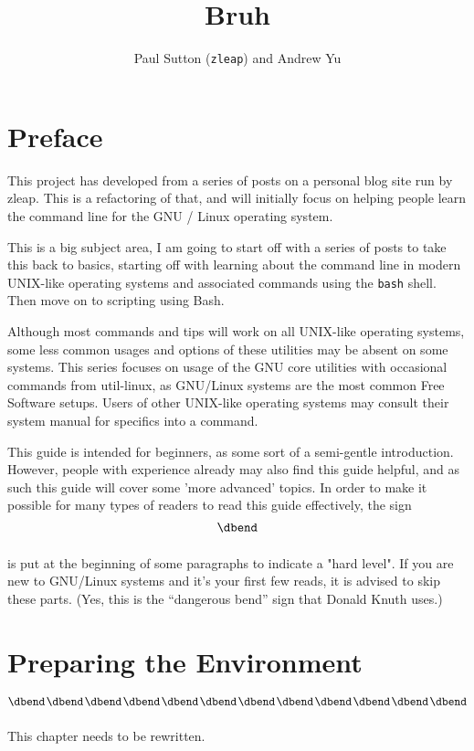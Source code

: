 \documentclass{extbook}
\title{Bruh}
\author{Paul Sutton (\texttt{zleap}) and Andrew Yu}
\begin{document}
\maketitle

\frontmatter
\chapter{Preface}

This project has developed from a series of posts on a personal blog site run by zleap. This is a refactoring of that,  and will initially focus on helping people learn the command line for the GNU / Linux operating system.

This is a big subject area, I am going to start off with a series of posts to take this back to basics, starting off with learning about the command line in modern UNIX-like operating systems and associated commands using the \texttt{bash} shell.  Then move on to scripting using Bash. 

Although most commands and tips will work on all UNIX-like operating systems, some less common usages and options of these utilities may be absent on some systems.  This series focuses on usage of the GNU core utilities with occasional commands from util-linux, as GNU/Linux systems are the most common Free Software setups.  Users of other UNIX-like operating systems may consult their system manual for specifics into a command.

This guide is intended for beginners, as some sort of a semi-gentle introduction.  However, people with experience already may also find this guide helpful, and as such this guide will cover some 'more advanced' topics.  In order to make it possible for many types of readers to read this guide effectively, the  sign
$$\vbox{\hbox{\dbend}\vskip 11pt}$$
is put at the beginning of some paragraphs to indicate a "hard level".  If you are new to GNU/Linux systems and it's your first few reads, it is advised to skip these parts.  (Yes, this is the ``{dangerous bend}'' sign that Donald Knuth uses.)

\tableofcontents

\mainmatter
\chapter{Preparing the Environment}

$$\vcenter{\hbox{\dbend\kern1pt\dbend\kern1pt\dbend\kern1pt\dbend\kern1pt\dbend\kern1pt\dbend\kern1pt\dbend\kern1pt\dbend\kern1pt\dbend\kern1pt\dbend\kern1pt\dbend\kern1pt\dbend}\vskip 11pt}$$
This chapter needs to be rewritten.
\end{document}
